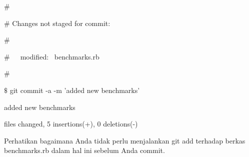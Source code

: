 \noindent 
{\fontsize{14pt}{14pt}\selectfont  $  \#  $ \\} \par
\noindent 
{\fontsize{14pt}{14pt}\selectfont  $  \#  $ Changes not staged for commit: \\} \par
\noindent 
{\fontsize{14pt}{14pt}\selectfont  $  \#  $ \\} \par
\noindent 
{\fontsize{14pt}{14pt}\selectfont  $  \#  $~~~modified:~  benchmarks.rb \\} \par
\noindent 
{\fontsize{14pt}{14pt}\selectfont  $  \#  $ \\} \par
\noindent 
{\fontsize{14pt}{14pt}\selectfont  $  \$  $ git commit -a -m 'added new benchmarks' \\} \par
\noindent 
{\fontsize{14pt}{14pt}\selectfont [master 83e38c7] added new benchmarks \\} \par
\noindent 
{\fontsize{14pt}{14pt} files changed, 5 insertions(+), 0 deletions(-) \\} \par
\vspace{14pt}
\noindent 
{\fontsize{14pt}{14pt}\selectfont Perhatikan bagaimana Anda tidak perlu menjalankan $  $git add $  $terhadap berkas benchmarks.rb dalam hal ini sebelum Anda commit. \\} \par
\vspace{14pt}
